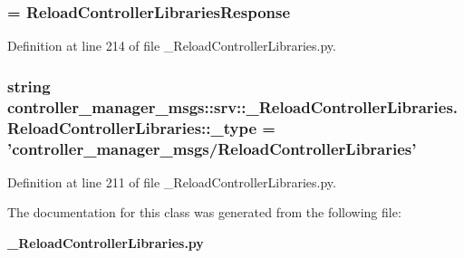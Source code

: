 \subsubsection[{\-\_\-response\-\_\-class}]{ = {\bf \-Reload\-Controller\-Libraries\-Response}\hspace{0.3cm}{\ttfamily  [static, private]}}\label{classcontroller__manager__msgs_1_1srv_1_1__ReloadControllerLibraries_1_1ReloadControllerLibraries_a344e0587eda5f93e0bb27b299655706e}


\-Definition at line 214 of file \-\_\-\-Reload\-Controller\-Libraries.\-py.

\subsubsection[{\-\_\-type}]{\setlength{\rightskip}{0pt plus 5cm}string {\bf controller\-\_\-manager\-\_\-msgs\-::srv\-::\-\_\-\-Reload\-Controller\-Libraries.\-Reload\-Controller\-Libraries\-::\-\_\-type} = 'controller\-\_\-manager\-\_\-msgs/{\bf \-Reload\-Controller\-Libraries}'\hspace{0.3cm}{\ttfamily  [static, private]}}\label{classcontroller__manager__msgs_1_1srv_1_1__ReloadControllerLibraries_1_1ReloadControllerLibraries_afd643df62365074cb12269a7a2fb9360}


\-Definition at line 211 of file \-\_\-\-Reload\-Controller\-Libraries.\-py.



\-The documentation for this class was generated from the following file\-:\begin{DoxyCompactItemize}
\item 
{\bf \-\_\-\-Reload\-Controller\-Libraries.\-py}\end{DoxyCompactItemize}
